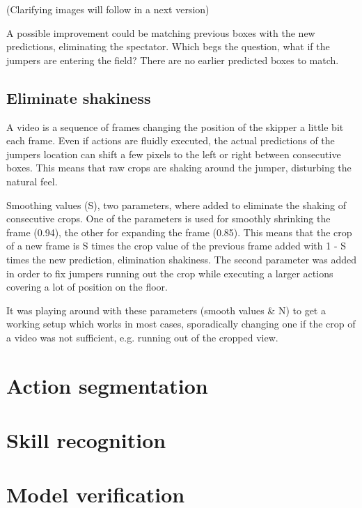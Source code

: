 (Clarifying images will follow in a next version)

A possible improvement could be matching previous boxes with the new predictions, eliminating the spectator. Which begs the question, what if the jumpers are entering the field? There are no earlier predicted boxes to match.

\subsection{Eliminate shakiness}

A video is a sequence of frames changing the position of the skipper a little bit each frame. Even if actions are fluidly executed, the actual predictions of the jumpers location can shift a few pixels to the left or right between consecutive boxes. This means that raw crops are shaking around the jumper, disturbing the natural feel.

Smoothing values (S), two parameters, where added to eliminate the shaking of consecutive crops. One of the parameters is used for smoothly shrinking the frame (0.94), the other for expanding the frame (0.85).
This means that the crop of a new frame is S times the crop value of the previous frame added with 1 - S times the new prediction, elimination shakiness. The second parameter was added in order to fix jumpers running out the crop while executing a larger actions covering a lot of position on the floor.

It was playing around with these parameters (smooth values \& N) to get a working setup which works in most cases, sporadically changing one if the crop of a video was not sufficient, e.g. running out of the cropped view.


\section{Action segmentation}

\section{Skill recognition}

\section{Model verification}
